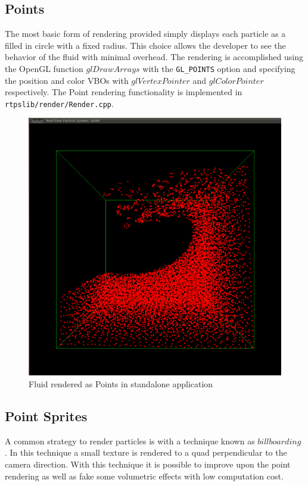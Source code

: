 \subsection{Points}
The most basic form of rendering provided simply displays each particle as a
filled in circle with a fixed radius. This choice allows the developer to
see the behavior of the fluid with minimal overhead. The rendering is
accomplished using the OpenGL function $glDrawArrays$ with the \verb|GL_POINTS|
option and specifying the position and color VBOs with $glVertexPointer$ and
$glColorPointer$ respectively. The Point rendering functionality is implemented
in \verb|rtpslib/render/Render.cpp|.

\begin{figure}[!htc]
 		\centering
		\includegraphics[scale=0.2]{figures/standalone.png}
        \caption{ Fluid rendered as Points in standalone application }
		\label{fig:points}
\end{figure}



\subsection{Point Sprites}
A common strategy to render particles is with a technique known as
$billboarding$ \cite{Knowles2009}.  In this technique a small texture is
rendered to a quad perpendicular to the camera direction. With this technique
it is possible to improve upon the point rendering as well as fake some
volumetric effects with low computation cost.

